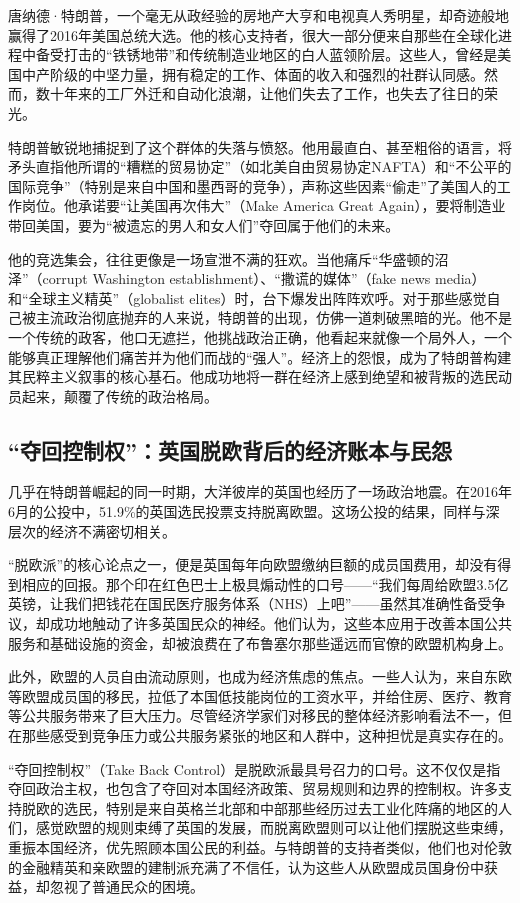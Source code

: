 唐纳德·特朗普，一个毫无从政经验的房地产大亨和电视真人秀明星，却奇迹般地赢得了2016年美国总统大选。他的核心支持者，很大一部分便来自那些在全球化进程中备受打击的“铁锈地带”和传统制造业地区的白人蓝领阶层。这些人，曾经是美国中产阶级的中坚力量，拥有稳定的工作、体面的收入和强烈的社群认同感。然而，数十年来的工厂外迁和自动化浪潮，让他们失去了工作，也失去了往日的荣光。

特朗普敏锐地捕捉到了这个群体的失落与愤怒。他用最直白、甚至粗俗的语言，将矛头直指他所谓的“糟糕的贸易协定”（如北美自由贸易协定NAFTA）和“不公平的国际竞争”（特别是来自中国和墨西哥的竞争），声称这些因素“偷走”了美国人的工作岗位。他承诺要“让美国再次伟大”（Make America Great Again），要将制造业带回美国，要为“被遗忘的男人和女人们”夺回属于他们的未来。

他的竞选集会，往往更像是一场宣泄不满的狂欢。当他痛斥“华盛顿的沼泽”（corrupt Washington establishment）、“撒谎的媒体”（fake news media）和“全球主义精英”（globalist elites）时，台下爆发出阵阵欢呼。对于那些感觉自己被主流政治彻底抛弃的人来说，特朗普的出现，仿佛一道刺破黑暗的光。他不是一个传统的政客，他口无遮拦，他挑战政治正确，他看起来就像一个局外人，一个能够真正理解他们痛苦并为他们而战的“强人”。经济上的怨恨，成为了特朗普构建其民粹主义叙事的核心基石。他成功地将一群在经济上感到绝望和被背叛的选民动员起来，颠覆了传统的政治格局。

\subsection{“夺回控制权”：英国脱欧背后的经济账本与民怨}

几乎在特朗普崛起的同一时期，大洋彼岸的英国也经历了一场政治地震。在2016年6月的公投中，51.9\%的英国选民投票支持脱离欧盟。这场公投的结果，同样与深层次的经济不满密切相关。

“脱欧派”的核心论点之一，便是英国每年向欧盟缴纳巨额的成员国费用，却没有得到相应的回报。那个印在红色巴士上极具煽动性的口号——“我们每周给欧盟3.5亿英镑，让我们把钱花在国民医疗服务体系（NHS）上吧”——虽然其准确性备受争议，却成功地触动了许多英国民众的神经。他们认为，这些本应用于改善本国公共服务和基础设施的资金，却被浪费在了布鲁塞尔那些遥远而官僚的欧盟机构身上。

此外，欧盟的人员自由流动原则，也成为经济焦虑的焦点。一些人认为，来自东欧等欧盟成员国的移民，拉低了本国低技能岗位的工资水平，并给住房、医疗、教育等公共服务带来了巨大压力。尽管经济学家们对移民的整体经济影响看法不一，但在那些感受到竞争压力或公共服务紧张的地区和人群中，这种担忧是真实存在的。

“夺回控制权”（Take Back Control）是脱欧派最具号召力的口号。这不仅仅是指夺回政治主权，也包含了夺回对本国经济政策、贸易规则和边界的控制权。许多支持脱欧的选民，特别是来自英格兰北部和中部那些经历过去工业化阵痛的地区的人们，感觉欧盟的规则束缚了英国的发展，而脱离欧盟则可以让他们摆脱这些束缚，重振本国经济，优先照顾本国公民的利益。与特朗普的支持者类似，他们也对伦敦的金融精英和亲欧盟的建制派充满了不信任，认为这些人从欧盟成员国身份中获益，却忽视了普通民众的困境。

